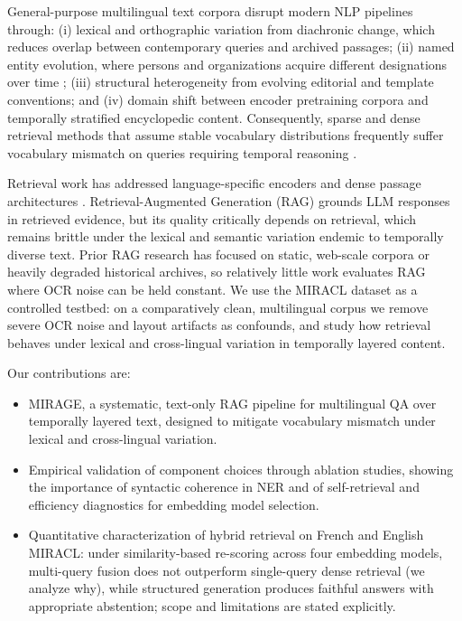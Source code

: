 \documentclass[11pt]{article}
\begin{document}
General-purpose multilingual text corpora disrupt modern NLP pipelines through: (i) lexical and orthographic variation from diachronic change, which reduces overlap between contemporary queries and archived passages; (ii) named entity evolution, where persons and organizations acquire different designations over time \citep{pan-etal-2017-cross,tedeschi2021wikineural}; (iii) structural heterogeneity from evolving editorial and template conventions; and (iv) domain shift between encoder pretraining corpora and temporally stratified encyclopedic content. Consequently, sparse and dense retrieval methods that assume stable vocabulary distributions frequently suffer vocabulary mismatch on queries requiring temporal reasoning \citep{schweter2022hmbert,reimers-2020-multilingual-sentence-bert}.

Retrieval work has addressed language-specific encoders and dense passage architectures \citep{zhang2023miracl}. Retrieval-Augmented Generation (RAG) \citep{lewis2020retrieval} grounds LLM responses in retrieved evidence, but its quality critically depends on retrieval, which remains brittle under the lexical and semantic variation endemic to temporally diverse text. Prior RAG research has focused on static, web-scale corpora or heavily degraded historical archives, so relatively little work evaluates RAG where OCR noise can be held constant. We use the MIRACL dataset \citep{zhang2023miracl} as a controlled testbed: on a comparatively clean, multilingual corpus we remove severe OCR noise and layout artifacts as confounds, and study how retrieval behaves under lexical and cross-lingual variation in temporally layered content.

Our contributions are:
\begin{itemize}
    \item MIRAGE, a systematic, text-only RAG pipeline for multilingual QA over temporally layered text, designed to mitigate vocabulary mismatch under lexical and cross-lingual variation.
    \item Empirical validation of component choices through ablation studies, showing the importance of syntactic coherence in NER and of self-retrieval and efficiency diagnostics for embedding model selection.
    \item Quantitative characterization of hybrid retrieval on French and English MIRACL: under similarity-based re-scoring across four embedding models, multi-query fusion does not outperform single-query dense retrieval (we analyze why), while structured generation produces faithful answers with appropriate abstention; scope and limitations are stated explicitly.
\end{itemize}
\end{document}
